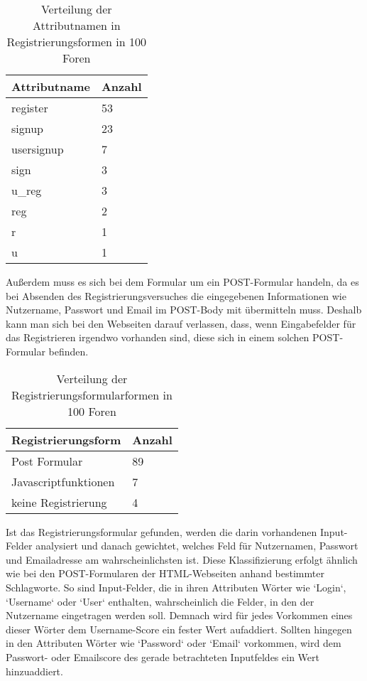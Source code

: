 \begin{table}[h!]
\centering 
\begin{tabular}{ | p{3cm} | p{3cm}|} \hline
Attributname & Anzahl \\ \hline
register & 53 \\ \hline
signup & 23 \\ \hline
usersignup & 7 \\ \hline
sign & 3 \\ \hline
u\_reg & 3 \\ \hline
reg & 2 \\ \hline
r & 1 \\ \hline
u & 1 \\ \hline
\end{tabular}
\caption{Verteilung der Attributnamen in Registrierungsformen in 100 Foren}
\end{table}



Außerdem muss es sich bei dem Formular um ein POST-Formular handeln, da es bei Absenden des Registrierungsversuches die eingegebenen Informationen wie Nutzername, Passwort und Email im POST-Body mit übermitteln muss.
Deshalb kann man sich bei den Webseiten darauf verlassen, dass, wenn Eingabefelder für das Registrieren irgendwo vorhanden sind, diese sich in einem solchen POST-Formular befinden.

\begin{table}[h!]
\centering 
\begin{tabular}{ | p{5cm} | p{3cm}|} \hline
Registrierungsform & Anzahl \\ \hline
Post Formular & 89 \\ \hline
Javascriptfunktionen & 7 \\ \hline
keine Registrierung & 4 \\ \hline
\end{tabular}
\caption{Verteilung der Registrierungsformularformen in 100 Foren}
\end{table}


Ist das Registrierungsformular gefunden, werden die darin vorhandenen Input-Felder analysiert und danach gewichtet, welches Feld für Nutzernamen, Passwort und Emailadresse am wahrscheinlichsten ist.
Diese Klassifizierung erfolgt ähnlich wie bei den POST-Formularen der HTML-Webseiten anhand bestimmter Schlagworte.
So sind Input-Felder, die in ihren Attributen Wörter wie `Login`, `Username` oder `User` enthalten, wahrscheinlich die Felder, in den der Nutzername eingetragen werden soll. Demnach wird für jedes Vorkommen eines dieser Wörter dem Username-Score ein fester Wert aufaddiert. Sollten hingegen in den Attributen Wörter wie `Password` oder `Email` vorkommen, wird dem Passwort- oder Emailscore des gerade betrachteten Inputfeldes ein Wert hinzuaddiert.

